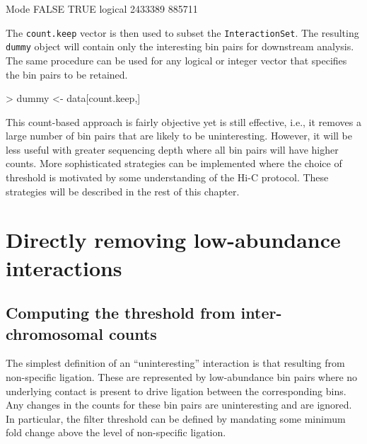 \documentclass[12pt]{report}
\renewenvironment{Schunk}{\vspace{0pt}}{\vspace{0pt}}
\newcommand{\code}[1]{{\small\texttt{#1}}}
\begin{document}
\begin{Schunk}
\begin{Soutput}
   Mode   FALSE    TRUE 
logical 2433389  885711 
\end{Soutput}
\end{Schunk}

The \code{count.keep} vector is then used to subset the \code{InteractionSet}.
The resulting \code{dummy} object will contain only the interesting bin pairs for downstream analysis.
The same procedure can be used for any logical or integer vector that specifies the bin pairs to be retained.

\begin{Schunk}
\begin{Sinput}
> dummy <- data[count.keep,]
\end{Sinput}
\end{Schunk}

This count-based approach is fairly objective yet is still effective, i.e., it removes a large number of bin pairs that are likely to be uninteresting.
However, it will be less useful with greater sequencing depth where all bin pairs will have higher counts.
More sophisticated strategies can be implemented where the choice of threshold is motivated by some understanding of the Hi-C protocol.
These strategies will be described in the rest of this chapter.

\section{Directly removing low-abundance interactions}
\label{sec:direct}

\subsection{Computing the threshold from inter-chromosomal counts}
The simplest definition of an ``uninteresting'' interaction is that resulting from non-specific ligation. 
These are represented by low-abundance bin pairs where no underlying contact is present to drive ligation between the corresponding bins. 
Any changes in the counts for these bin pairs are uninteresting and are ignored.
In particular, the filter threshold can be defined by mandating some minimum fold change above the level of non-specific ligation.
\end{document}
